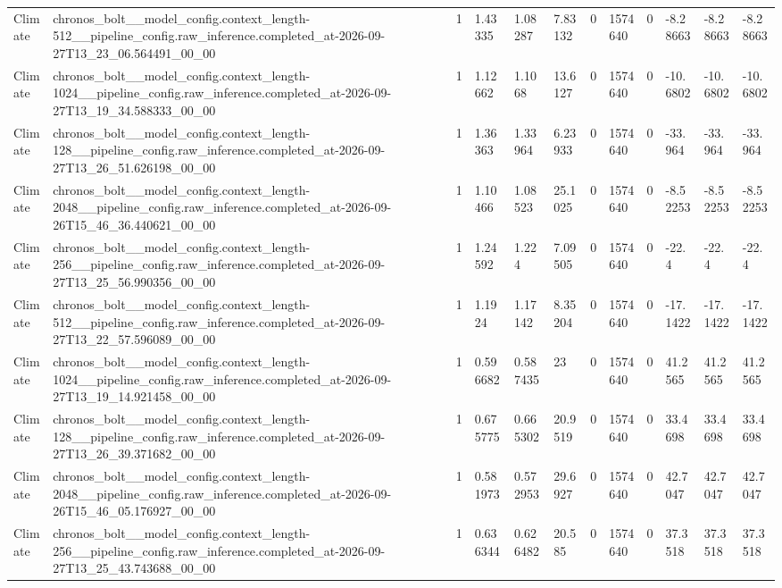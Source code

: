 \begin{tabular}{llllllllllll}
Climate & chronos\_bolt\_\_model\_config.context\_length-512\_\_pipeline\_config.raw\_inference.completed\_at-2026-09-27T13\_23\_06.564491\_00\_00 & 1 & 1.43335 & 1.08287 & 7.83132 & 0 & 1574640 & 0 & -8.28663 & -8.28663 & -8.28663 \\
Climate & chronos\_bolt\_\_model\_config.context\_length-1024\_\_pipeline\_config.raw\_inference.completed\_at-2026-09-27T13\_19\_34.588333\_00\_00 & 1 & 1.12662 & 1.1068 & 13.6127 & 0 & 1574640 & 0 & -10.6802 & -10.6802 & -10.6802 \\
Climate & chronos\_bolt\_\_model\_config.context\_length-128\_\_pipeline\_config.raw\_inference.completed\_at-2026-09-27T13\_26\_51.626198\_00\_00 & 1 & 1.36363 & 1.33964 & 6.23933 & 0 & 1574640 & 0 & -33.964 & -33.964 & -33.964 \\
Climate & chronos\_bolt\_\_model\_config.context\_length-2048\_\_pipeline\_config.raw\_inference.completed\_at-2026-09-26T15\_46\_36.440621\_00\_00 & 1 & 1.10466 & 1.08523 & 25.1025 & 0 & 1574640 & 0 & -8.52253 & -8.52253 & -8.52253 \\
Climate & chronos\_bolt\_\_model\_config.context\_length-256\_\_pipeline\_config.raw\_inference.completed\_at-2026-09-27T13\_25\_56.990356\_00\_00 & 1 & 1.24592 & 1.224 & 7.09505 & 0 & 1574640 & 0 & -22.4 & -22.4 & -22.4 \\
Climate & chronos\_bolt\_\_model\_config.context\_length-512\_\_pipeline\_config.raw\_inference.completed\_at-2026-09-27T13\_22\_57.596089\_00\_00 & 1 & 1.1924 & 1.17142 & 8.35204 & 0 & 1574640 & 0 & -17.1422 & -17.1422 & -17.1422 \\
Climate & chronos\_bolt\_\_model\_config.context\_length-1024\_\_pipeline\_config.raw\_inference.completed\_at-2026-09-27T13\_19\_14.921458\_00\_00 & 1 & 0.596682 & 0.587435 & 23 & 0 & 1574640 & 0 & 41.2565 & 41.2565 & 41.2565 \\
Climate & chronos\_bolt\_\_model\_config.context\_length-128\_\_pipeline\_config.raw\_inference.completed\_at-2026-09-27T13\_26\_39.371682\_00\_00 & 1 & 0.675775 & 0.665302 & 20.9519 & 0 & 1574640 & 0 & 33.4698 & 33.4698 & 33.4698 \\
Climate & chronos\_bolt\_\_model\_config.context\_length-2048\_\_pipeline\_config.raw\_inference.completed\_at-2026-09-26T15\_46\_05.176927\_00\_00 & 1 & 0.581973 & 0.572953 & 29.6927 & 0 & 1574640 & 0 & 42.7047 & 42.7047 & 42.7047 \\
Climate & chronos\_bolt\_\_model\_config.context\_length-256\_\_pipeline\_config.raw\_inference.completed\_at-2026-09-27T13\_25\_43.743688\_00\_00 & 1 & 0.636344 & 0.626482 & 20.585 & 0 & 1574640 & 0 & 37.3518 & 37.3518 & 37.3518 \\

\end{tabular}
